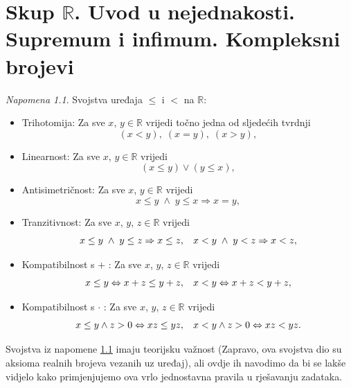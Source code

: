 \documentclass{book}
\theoremstyle{definition}
\theoremstyle{definition}
\theoremstyle{remark}
\newtheorem{remark}{Napomena}
\begin{document}
\chapter{Skup \texorpdfstring{$\mathbb{R}$}{R}. Uvod u nejednakosti. Supremum i infimum. Kompleksni brojevi}
\fancyhead[RO, RE]{}
\begin{remark}
\label{ordrem}
Svojstva uređaja $\leq$ i $<$ na $\mathbb{R}$:
\begin{itemize}
\item Trihotomija: Za sve $x$, $y\in \mathbb{R}$ vrijedi točno jedna od sljedećih tvrdnji
$$(x<y),\; (x=y),\; (x>y),$$
\item Linearnost: Za sve $x$, $y\in \mathbb{R}$ vrijedi
$$(x\leq y) \vee (y\leq x),$$
\item Antisimetričnost: Za sve $x$, $y\in \mathbb{R}$ vrijedi
$$x\leq y\; \wedge\; y\leq x\Rightarrow x=y,$$
\item Tranzitivnost: Za sve $x$, $y$, $z\in \mathbb{R}$ vrijedi
$$x\leq y\; \wedge\; y\leq z\Rightarrow x\leq z,\hspace{0.3cm}x< y\; \wedge\; y< z\Rightarrow x< z,$$
\item Kompatibilnost s $+$ : Za sve $x$, $y$, $z\in \mathbb{R}$ vrijedi
$$x\leq y\Leftrightarrow x+z\leq y+z,\hspace{0.3cm}x< y\Leftrightarrow x+z< y+z,$$
\item Kompatibilnost s $\cdot$ : Za sve $x$, $y$, $z\in \mathbb{R}$ vrijedi
$$x\leq y\wedge z>0\Leftrightarrow xz\leq yz,\hspace{0.3cm}x< y\wedge z>0\Leftrightarrow xz< yz.$$
\end{itemize}
\end{remark}

Svojstva iz napomene \ref{ordrem} imaju teorijsku važnost (Zapravo, ova svojstva dio su aksioma realnih brojeva vezanih uz uređaj), ali ovdje ih navodimo da bi se lakše vidjelo kako primjenjujemo ova vrlo jednostavna pravila u rješavanju zadataka.
\end{document}
